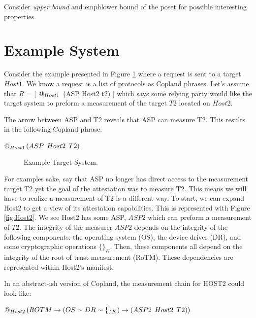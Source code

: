 \documentclass[12pt, letterpaper]{article}
\begin{document}
Consider \emph{upper bound} and emph{lower bound} of the poset for possible interesting properties. 


\section{Example System}

Consider the example presented in Figure \ref{fig:Host1} where a request is sent to a target $Host1$. We know a request is a list of protocols as Copland phrases. Let's assume that $R$ = [ $\mathop{@_{Host1}}{} $ (ASP Host2 t2) ] which says some relying party would like the target system to preform a measurement of the target $T2$ located on $Host2$. 

The arrow between ASP and T2 reveals that ASP can measure T2. This results in the following Copland phrase: 

\begin{center}
  $ \mathop{@_{Host1}}{(}ASP\:\: Host2\:\: T2)$
\end{center}

\begin{figure}[hbtp]
  \centering 
  \caption{Example Target System.}
  \label{fig:Host1}
\end{figure}

For examples sake, say that ASP no longer has direct access to the measurement target T2 yet the goal of the attestation was to measure T2. This means we will have to realize a measurement of T2 is a different way. To start, we can expand Host2 to get a view of its attestation capabilities. This is represented with Figure \ref{fig:Host2}. We see Host2 has some ASP, $ASP2$ which can preform a measurement of $T2$. The integrity of the measurer $ASP2$ depends on the integrity of the following components: the operating system (OS), the device driver (DR), and some cryptographic operations $ \{ \}_{K}$. Then, these components all depend on the integrity of the root of trust measurement (RoTM). These dependencies are represented within Host2's manifest. 

In an abstract-ish version of Copland, the measurement chain for HOST2 could look like: 

\begin{center}
  $ \mathop{@_{Host2}}{(ROTM \to ( OS \stackrel{}{\sim} DR \stackrel{}{\sim} \{ \}_{K} ) \to (ASP2\:\: Host2\:\: T2))}$
\end{center}
\end{document}
